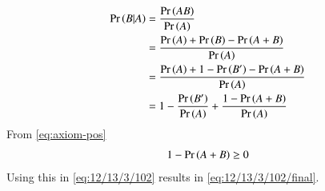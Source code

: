 \begin{align}
    \pr{B|A} &= \frac{\pr{AB}}{\pr{A}}\\
    &= \frac{\pr{A} + \pr{B} - \pr{A+B}}{\pr{A}}
    \\
    &= \frac{\pr{A} + 1-\pr{B^\prime} - \pr{A+B}}{\pr{A}}
    \\
    &= 1-\frac{ \pr{B^\prime} }{\pr{A}}
+\frac{  1- \pr{A+B}}{\pr{A}}
	\label{eq:12/13/3/102}
\end{align}
From 
	\eqref{eq:axiom-pos}
\begin{align}
{  1- \ensuremath{\Pr\left(A+B\right)}} \ge 0
\end{align}
Using this in 
	\eqref{eq:12/13/3/102}
	results in 
	\eqref{eq:12/13/3/102/final}.
